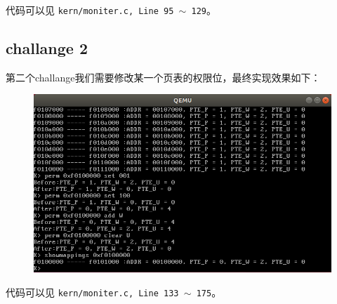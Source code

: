 \documentclass[11pt]{article}
\begin{document}
\par 代码可以见 \texttt{kern/moniter.c, Line 95 $\sim$ 129}。
	\subsection*{challange 2}
	
	\par 第二个challange我们需要修改某一个页表的权限位，最终实现效果如下：
		
		\begin{figure}[htbp]
			\centering
			\includegraphics[width=0.7\linewidth]{lab2-cha2.png}
		\end{figure}
		
		\par 代码可以见 \texttt{kern/moniter.c, Line 133 $\sim$ 175}。
\end{document}
